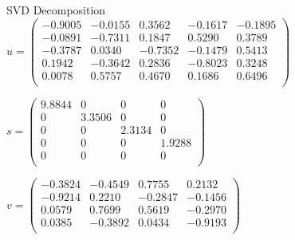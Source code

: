 \documentclass{article}
\begin{document}
SVD Decomposition \\
$u = 
\begin{pmatrix}
   -0.9005  & -0.0155  &  0.3562 &  -0.1617 &  -0.1895 \\
   -0.0891  & -0.7311  &  0.1847  &  0.5290 &   0.3789 \\
   -0.3787  &  0.0340  & -0.7352 &  -0.1479  &  0.5413 \\
    0.1942  & -0.3642  &  0.2836 &  -0.8023  &  0.3248 \\
    0.0078  &  0.5757  &  0.4670  &  0.1686  & 0.6496 \\
\end{pmatrix}$

$s =
\begin{pmatrix}
    9.8844    &     0   &      0     &    0\\
         0 &  3.3506   &      0     &    0\\
         0    &     0  &  2.3134    &     0\\
         0    &     0    &     0   & 1.9288\\
         0    &     0     &    0    &     0\\
\end{pmatrix}$

$v =
\begin{pmatrix}
   -0.3824  & -0.4549  &  0.7755  &  0.2132 \\
   -0.9214  &  0.2210  & -0.2847  & -0.1456 \\
    0.0579  &  0.7699  &  0.5619  & -0.2970 \\
    0.0385  & -0.3892  &  0.0434  & -0.9193 \\
 \end{pmatrix}$
\end{document}
